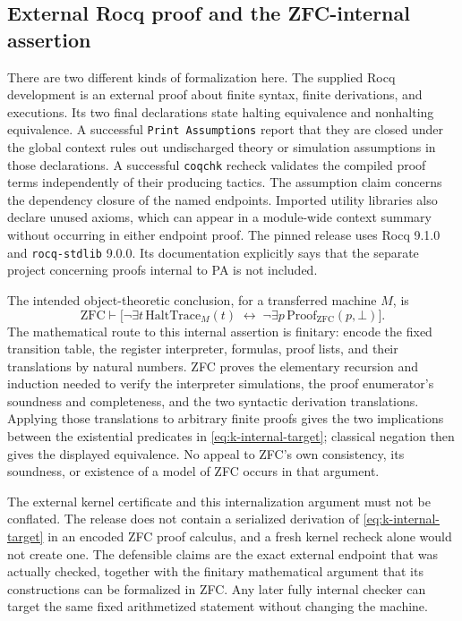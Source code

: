 \subsection{External Rocq proof and the ZFC-internal assertion}

There are two different kinds of formalization here. The supplied Rocq
development is an external proof about finite syntax, finite derivations,
and executions. Its two final declarations state halting equivalence and
nonhalting equivalence. A successful \texttt{Print Assumptions} report
that they are closed under the global context rules out undischarged
theory or simulation assumptions in those declarations. A successful
\texttt{coqchk} recheck validates the compiled proof terms independently
of their producing tactics. The assumption claim concerns the dependency
closure of the named endpoints. Imported utility libraries also declare
unused axioms, which can appear in a module-wide context summary without
occurring in either endpoint proof. The pinned release uses Rocq 9.1.0 and
\texttt{rocq-stdlib} 9.0.0. Its documentation explicitly says that the
separate project concerning proofs internal to PA is not included.

The intended object-theoretic conclusion, for a transferred machine \(M\),
is
\begin{equation}
 \mathrm{ZFC}\vdash
 \bigl[\neg\exists t\,\mathrm{HaltTrace}_M(t)
       \;\longleftrightarrow\;
       \neg\exists p\,\mathrm{Proof}_{\mathrm{ZFC}}(p,\bot)\bigr].
 \label{eq:k-internal-target}
\end{equation}
The mathematical route to this internal assertion is finitary: encode
the fixed transition table, the register interpreter, formulas, proof
lists, and their translations by natural numbers. ZFC proves the elementary
recursion and induction needed to verify the interpreter simulations,
the proof enumerator's soundness and completeness, and the two syntactic
derivation translations. Applying those translations to arbitrary finite
proofs gives the two implications between the existential predicates in
\eqref{eq:k-internal-target}; classical negation then gives the displayed
equivalence. No appeal to ZFC's own consistency, its soundness, or existence
of a model of ZFC occurs in that argument.

The external kernel certificate and this internalization argument must not
be conflated. The release does not contain a serialized derivation of
\eqref{eq:k-internal-target} in an encoded ZFC proof calculus, and a fresh
kernel recheck alone would not create one. The defensible claims are the
exact external endpoint that was actually checked, together with the
finitary mathematical argument that its constructions can be formalized
in ZFC. Any later fully internal checker can target the same fixed
arithmetized statement without changing the machine.

